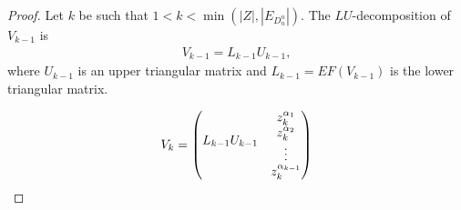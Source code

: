 \documentclass[11pt]{llncs}
\begin{document}
\begin{proof}
    Let $k$ be such that $1<k< \min{\left(|Z|,|E_{D_n^n}|\right)}$. The $LU$-decomposition of $V_{k-1}$ is  
    \begin{align*}
        V_{k-1} = L_{k-1} U_{k-1},
    \end{align*}
    where $U_{k-1}$ is an upper triangular matrix and $L_{k-1} = EF\left(V_{k-1}\right)$ is the lower triangular matrix.

\[
V_{k} = 
\begin{pmatrix}
\multicolumn{4}{c}{\multirow{4}{*}{$L_{k-1}U_{k-1}$}} & z_k^{\alpha_1}\\
& & & & z_k^{\alpha_2}\\
& & & & \vdots\\
& & & & z_{k}^{\alpha_{k-1}}\\

\end{pmatrix}\]
\end{proof}
\end{document}
